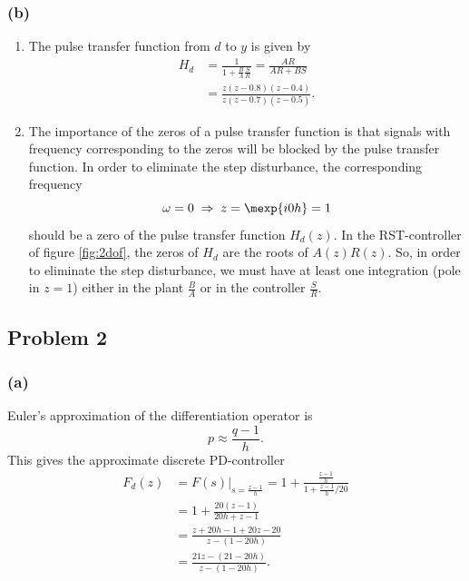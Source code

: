 \documentclass{scrartcl}
\begin{document}
\subsubsection*{(b)}
\label{sec:orgheadline10}
\begin{enumerate}
\item The pulse transfer function from \(d\) to \(y\) is given by
\begin{equation*}
 \begin{split}
  H_d &= \frac{1}{1 + \frac{B}{A}\frac{S}{R}} = \frac{AR}{AR + BS}\\
    &= \frac{z(z-0.8)(z-0.4)}{z(z-0.7)(z-0.5)}.
 \end{split}
\end{equation*}
\item The importance of the zeros of a pulse transfer function is that signals with frequency corresponding to the zeros will be blocked by the pulse transfer function. In order to eliminate the step disturbance, the corresponding frequency 
\[ \omega=0 \;\Rightarrow\; z=\mexp{i0h} = 1\]
should be a zero of the pulse transfer function \(H_d(z)\). In the RST-controller of figure \ref{fig:2dof}, the zeros of \(H_d\) are the roots of \(A(z)R(z)\). So, in order to eliminate the step disturbance, we must have at least one integration (pole in \(z=1\)) either in the plant \(\frac{B}{A}\) or in the controller \(\frac{S}{R}\).
\end{enumerate}

\subsection*{Problem 2}
\label{sec:orgheadline14}

\subsubsection*{(a)}
\label{sec:orgheadline12}
Euler's approximation of the differentiation operator is
\[ p \approx \frac{q-1}{h}. \]
This gives the approximate discrete PD-controller
\begin{equation*}
 \begin{split}
 F_d(z) &= F(s)|_{s = \frac{z-1}{h}} = 1 + \frac{\frac{z-1}{h}}{1 + \frac{z-1}{h}/20}\\
 &= 1 + \frac{20(z-1)}{20h + z - 1}\\
 &= \frac{z + 20h - 1 + 20z - 20}{z - (1-20h)}\\
 &= \frac{21z - (21 - 20h)}{z - (1-20h)}.
 \end{split}
\end{equation*}
\end{document}
